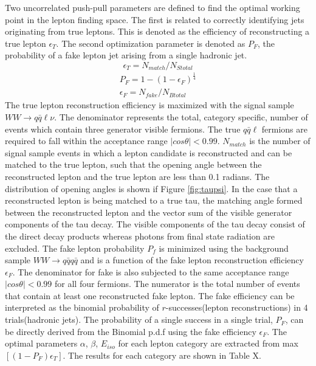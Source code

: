 Two uncorrelated push-pull parameters are defined to find the optimal working point in the lepton finding space. The first is related to correctly identifying jets originating from true leptons. This is denoted as the efficiency of reconstructing a true lepton $\epsilon_T$. The second optimization parameter is denoted as $P_F$, the probability of a fake lepton jet arising from a single hadronic jet.  
\begin{equation}
\label{eq:et}
\epsilon_T = N_{match}/N_{Stotal}
\end{equation}
\begin{equation}
\begin{split}
\label{eq:pf}
P_F = 1-(1-\epsilon_F)^{\frac{1}{4}} \\
\epsilon_F = N_{fake}/N_{Btotal}
\end{split}
\end{equation}
The true lepton reconstruction efficiency is maximized with the signal sample $WW\rightarrow q\bar{q}\ell\nu$. The denominator represents the total, category specific, number of events which contain three generator visible fermions. The true $q\bar{q}\ell$ fermions are required to fall within the acceptance range $|cos\theta| < 0.99$. $N_{match}$ is the number of signal sample events in which a lepton candidate is reconstructed and can be matched to the true lepton, such that the opening angle between the reconstructed lepton and the true lepton are less than 0.1 radians. The distribution of opening angles is shown if Figure \ref{fig:taupsi}. In the case that a reconstructed lepton is being matched to a true tau, the matching angle formed between the reconstructed lepton and the vector sum of the visible generator components of the tau decay. The visible components of the tau decay consist of the direct decay products whereas photons from final state radiation are excluded. The fake lepton probability $P_f$ is minimized using the background sample $WW\rightarrow q\bar{q}q\bar{q}$ and is a function of the fake lepton reconstruction efficiency $\epsilon_F$. The denominator for fake is also subjected to the same acceptance range $|cos\theta| < 0.99$ for all four fermions. The numerator is the total number of events  that contain at least one reconstructed fake lepton. The fake efficiency can be interpreted as the binomial probability of $r$-successes(lepton reconstructions) in 4 trials(hadronic jets). The probability of a single success in a single trial, $P_F$, can be directly derived from the Binomial p.d.f using the fake efficiency $\epsilon_F$. The optimal parameters $\alpha$, $\beta$, $E_{iso}$ for each lepton category are extracted from max$[(1-P_F)\epsilon_T]$. The results for each category are shown in Table X. 


